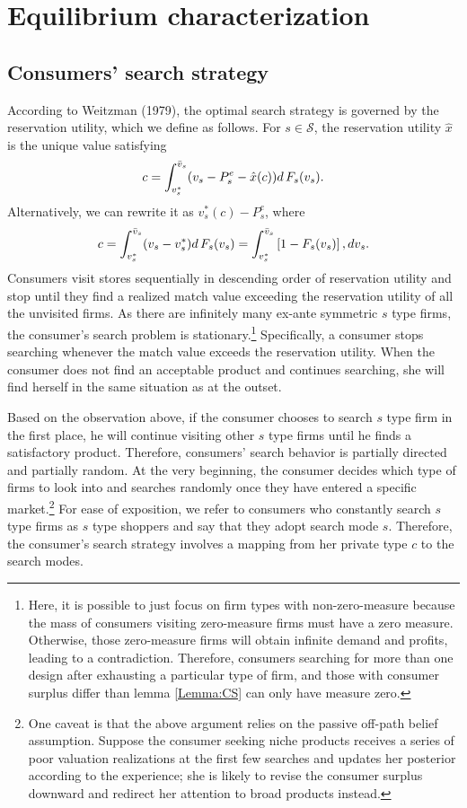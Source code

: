 \documentclass[14pt]{article}
\theoremstyle{plain}
\theoremstyle{definition}
\theoremstyle{remark}
\DeclareRobustCommand\1{\futurelet\oneNext\oneCheck}
\renewcommand{\S}{\mathcal{S}}
\begin{document}
\section{Equilibrium characterization}\label{section:eq}
\subsection{Consumers' search strategy}\label{subsection:consumer}
According to Weitzman (1979), the optimal search strategy is governed by the reservation utility, which we define as follows.
For $s\in \S$, the reservation utility $\hat{x}$ is the unique value satisfying
\begin{equation*}
    c=\int_{v_s^*}^{\Bar{v}_s} (v_{s}-P^e_s-\hat{x}(c)) d\,F_s(v_{s}).
\end{equation*}
Alternatively, we can rewrite it as $v_s^*(c)-P^e_s$, where
\begin{equation}\label{eq:reservation_utility}
    c = \int_{v_s^*}^{\Bar{v}_s} (v_{s}-v_s^*) d\,F_s(v_{s})=\int_{v_s^*}^{\Bar{v}_s} \left[1-F_s(v_{s}) \right],dv_s.
\end{equation}
Consumers visit stores sequentially in descending order of reservation utility and stop until they find a realized match value exceeding the reservation utility of all the unvisited firms. As there are infinitely many ex-ante symmetric $s$ type firms, the consumer's search problem is stationary.\footnote{Here, it is possible to just focus on firm types with non-zero-measure because the mass of consumers visiting zero-measure firms must have a zero measure. Otherwise, those zero-measure firms will obtain infinite demand and profits, leading to a contradiction. Therefore, consumers searching for more than one design after exhausting a particular type of firm, and those with consumer surplus differ than lemma \ref{Lemma:CS}  can only have measure zero.} Specifically, a consumer stops searching whenever the match value exceeds the reservation utility. When the consumer does not find an acceptable product and continues searching, she will find herself in the same situation as at the outset.

Based on the observation above, if the consumer chooses to search $s$ type firm in the first place, he will continue visiting other $s$ type firms until he finds a satisfactory product. Therefore, consumers' search behavior is partially directed and partially random. At the very beginning, the consumer decides which type of firms to look into and searches randomly once they have entered a specific market.\footnote{One caveat is that the above argument relies on the passive off-path belief assumption. Suppose the consumer seeking niche products receives a series of poor valuation realizations at the first few searches and updates her posterior according to the experience; she is likely to revise the consumer surplus downward and redirect her attention to broad products instead.} For ease of exposition, we refer to consumers who constantly search $s$ type firms as $s$ type shoppers and say that they adopt search mode $s$. Therefore, the consumer's search strategy involves a mapping from her private type $c$ to the search modes.
\end{document}
